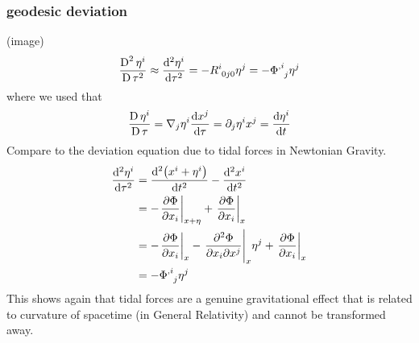 \subsubsection{geodesic deviation}
(image)
\begin{equation}
    \frac{\difD^2 \eta^i}{\difD \tau^2} \approx \frac{\dif{}^2 \eta^i}{\dif{} \tau^2} 
    = - \tensor{R}{^i_0_j_0} \eta^j = - \tensor{\Phi}{^,^i_j}\tensor{\eta}{^j}
\end{equation}
where we used that
\begin{equation}
    \frac{\difD{} \eta^i}{\difD{} \tau} = \nabla_j \eta^i \frac{\dif x^j}{\dif \tau} = \partial_j \eta^i x^j = \frac{\dif \eta^i}{\dif t}
\end{equation}
Compare to the deviation equation due to tidal forces in Newtonian Gravity.
\begin{equation}
    \begin{split}
        \frac{\dif{}^2 \eta^i}{\dif \tau^2} &= \frac{\dif{}^2 \left( x^i + \eta^i \right)}{\dif{} t^2} - \frac{\dif{}^2 x^i}{\dif{}t^2} \\
        &= - \left. \frac{\partial \Phi}{\partial x_i} \right|_{x+\eta} + \left. \frac{\partial \Phi}{\partial x_i} \right|_{x} \\
        &= - \left. \frac{\partial \Phi}{\partial x_i} \right|_{x} 
        - \left. \frac{\partial^2 \Phi}{\partial x_i \partial x^j} \right|_{x} \eta^j 
        + \left. \frac{\partial \Phi}{\partial x_i} \right|_{x} \\
        &= - \tensor{\Phi}{^,^i_j} \eta^j
    \end{split}
\end{equation}
This shows again that tidal forces are a genuine gravitational effect that is related to curvature of spacetime (in General Relativity) 
and cannot be transformed away.